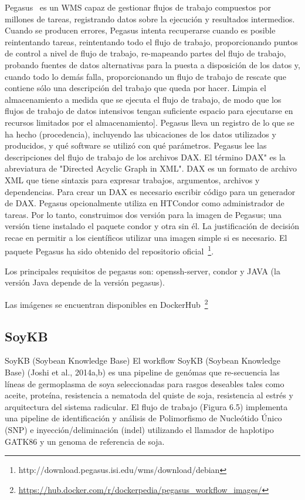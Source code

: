 Pegasus~\cite{} es un WMS capaz de gestionar flujos de trabajo compuestos por millones de tareas, registrando datos sobre la ejecución y resultados intermedios. 
Cuando se producen errores, Pegasus intenta recuperarse cuando es posible reintentando tareas, reintentando todo el flujo de trabajo, proporcionando puntos de control a nivel de flujo de trabajo, re-mapeando partes del flujo de trabajo, probando fuentes de datos alternativas para la puesta a disposición de los datos y, cuando todo lo demás falla, proporcionando un flujo de trabajo de rescate que contiene sólo una descripción del trabajo que queda por hacer. Limpia el almacenamiento a medida que se ejecuta el flujo de trabajo, de modo que los flujos de trabajo de datos intensivos tengan suficiente espacio para ejecutarse en recursos limitados por el almacenamiento]. Pegasus lleva un registro de lo que se ha hecho (procedencia), incluyendo las ubicaciones de los datos utilizados y producidos, y qué software se utilizó con qué parámetros.
Pegasus lee las descripciones del flujo de trabajo de los archivos DAX. El término DAX" es la abreviatura de "Directed Acyclic Graph in XML". DAX es un formato de archivo XML que tiene sintaxis para expresar trabajos, argumentos, archivos y dependencias. Para crear un DAX es necesario escribir código para un generador de DAX. 
Pegasus opcionalmente utiliza en HTCondor como administrador de tareas. Por lo tanto, construimos dos versión para la imagen de Pegasus; una versión tiene instalado el paquete condor y otra sin él. La justificación de decisión recae en permitir a los científicos utilizar una imagen simple si es necesario.
El paquete Pegasus ha sido obtenido del repositorio oficial~\footnote{http://download.pegasus.isi.edu/wms/download/debian}.


Los principales requisitos de pegasus son: openssh-server, condor y JAVA (la versión Java depende de la versión pegasus).


Las imágenes se encuentran disponibles en DockerHub~\footnote{\url{https://hub.docker.com/r/dockerpedia/pegasus_workflow_images/}}



\subsection{SoyKB}

SoyKB (Soybean Knowledge Base)
El workflow SoyKB (Soybean Knowledge Base) (Joshi et al., 2014a,b) es una pipeline de genómas que re-secuencia las líneas de germoplasma de soya seleccionadas para rasgos deseables tales como aceite, proteína, resistencia a nematoda del quiste de soja, resistencia al estrés y arquitectura del sistema radicular. El flujo de trabajo (Figura 6.5) implementa una pipeline de identificación y análisis de Polimorfismo de Nucleótido Único (SNP) e inyección/deliminación (indel) utilizando el llamador de haplotipo GATK86 y un genoma de referencia de soja.

